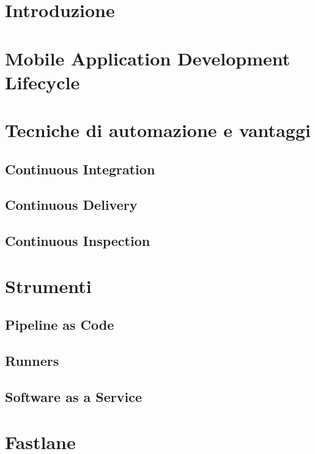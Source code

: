 
\section{Introduzione}

\section{Mobile Application Development Lifecycle}

\section{Tecniche di automazione e vantaggi}
\subsection{Continuous Integration}

\subsection{Continuous Delivery}

\subsection{Continuous Inspection}

\section{Strumenti}
\subsection{Pipeline as Code}

\subsection{Runners}

\subsection{Software as a Service}

\section{Fastlane}
